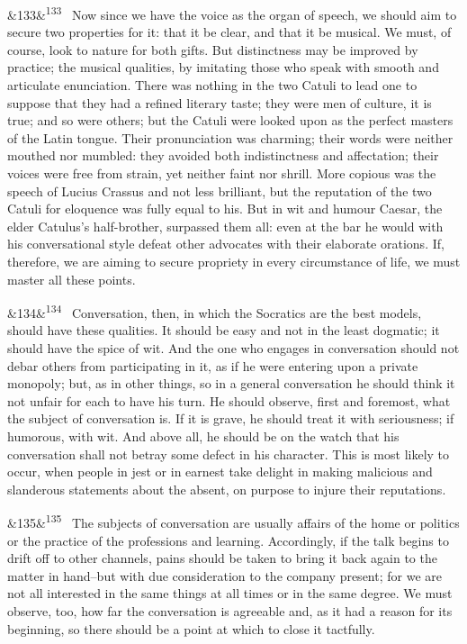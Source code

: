 \documentclass[12pt]{article}
\newcommand{\para}[1][]{\par\noindent\ifx&#1&\else\textsuperscript{\footnotesize #1}~\fi}
\begin{document}
\para[133] Now since we have the voice as the organ of speech, we should aim to secure two properties for it: that it be clear, and that it be musical. We must, of course, look to nature for both gifts. But distinctness may be improved by practice; the musical qualities, by imitating those who speak with smooth and articulate enunciation. There was nothing in the two Catuli to lead one to suppose that they had a refined literary taste; they were men of culture, it is true; and so were others; but the Catuli were looked upon as the perfect masters of the Latin tongue. Their pronunciation was charming; their words were neither mouthed nor mumbled: they avoided both indistinctness and affectation; their voices were free from strain, yet neither faint nor shrill. More copious was the speech of Lucius Crassus and not less brilliant, but the reputation of the two Catuli for eloquence was fully equal to his. But in wit and humour Caesar, the elder Catulus's half-brother, surpassed them all: even at the bar he would with his conversational style defeat other advocates with their elaborate orations. If, therefore, we are aiming to secure propriety in every circumstance of life, we must master all these points.

\para[134] Conversation, then, in which the Socratics are the best models, should have these qualities. It should be easy and not in the least dogmatic; it should have the spice of wit. And the one who engages in conversation should not debar others from participating in it, as if he were entering upon a private monopoly; but, as in other things, so in a general conversation he should think it not unfair for each to have his turn. He should observe, first and foremost, what the subject of conversation is. If it is grave, he should treat it with seriousness; if humorous, with wit. And above all, he should be on the watch that his conversation shall not betray some defect in his character. This is most likely to occur, when people in jest or in earnest take delight in making malicious and slanderous statements about the absent, on purpose to injure their reputations.

\para[135] The subjects of conversation are usually affairs of the home or politics or the practice of the professions and learning. Accordingly, if the talk begins to drift off to other channels, pains should be taken to bring it back again to the matter in hand--but with due consideration to the company present; for we are not all interested in the same things at all times or in the same degree. We must observe, too, how far the conversation is agreeable and, as it had a reason for its beginning, so there should be a point at which to close it tactfully.
\end{document}
